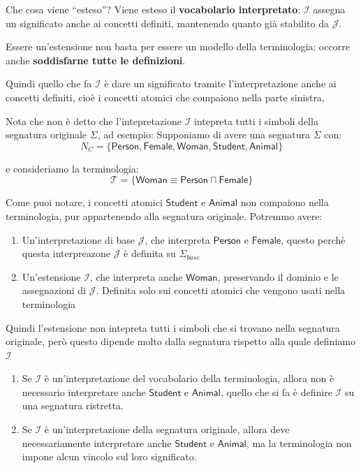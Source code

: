\begin{observation}{Che cosa viene ``esteso''?}
    Viene esteso il \textbf{vocabolario interpretato}:
    $\mathcal{I}$ assegna un significato anche ai concetti
    definiti, mantenendo quanto già stabilito da $\mathcal{J}$.

    Essere un'estensione non basta per essere un modello
    della terminologia: occorre anche
    \textbf{soddisfarne tutte le definizioni}.
\end{observation}

Quindi quello che fa $\mathcal{I}$ è dare un significato tramite l'interpretazione anche ai concetti definiti, cioè i concetti atomici che compaiono nella parte sinistra,
\begin{observation}{}
    Nota che non è detto che l'intepretazione $\mathcal{I}$ intepreta tutti i simboli della segnatura originale \(\Sigma\), ad esempio:
    Supponiamo di avere una segnatura \(\Sigma\) con:
\[
N_C=\{
\mathsf{Person},\mathsf{Female},\mathsf{Woman},
\mathsf{Student},\mathsf{Animal}
\}
\]

e consideriamo la terminologia:
\[
\mathcal T=\{
\mathsf{Woman}\equiv
\mathsf{Person}\sqcap\mathsf{Female}
\}
\]

Come puoi notare, i concetti atomici \(\mathsf{Student}\) e \(\mathsf{Animal}\) non compaiono nella terminologia, pur appartenendo alla segnatura originale.
Potremmo avere:
\begin{enumerate}
    \item Un'interpretazione di base \(\mathcal J\), che interpreta \(\mathsf{Person}\) e \(\mathsf{Female}\), questo perchè questa interpreazone $\mathcal{J}$ è definita su $\Sigma_{base}$
    \item Un'estensione \(\mathcal I\), che interpreta anche \(\mathsf{Woman}\), preservando il dominio e le assegnazioni di \(\mathcal J\). Definita solo sui concetti atomici che vengono usati nella terminologia
\end{enumerate}
Quindi l'estensione non intepreta tutti i simboli che si trovano nella segnatura originale, però questo dipende molto dalla segnatura rispetto alla quale definiamo \(\mathcal I\)
\begin{enumerate}
    \item Se \(\mathcal I\) è un'interpretazione del vocabolario della terminologia, allora non è necessario interpretare anche \(\mathsf{Student}\) e \(\mathsf{Animal}\), quello che si fa è definire $\mathcal{I}$ su una segnatura ristretta.
    \item Se \(\mathcal I\) è un'interpretazione della segnatura originale, allora deve necessariamente interpretare anche \(\mathsf{Student}\) e \(\mathsf{Animal}\), ma la terminologia non impone alcun vincolo sul loro significato.
\end{enumerate}
\end{observation}
